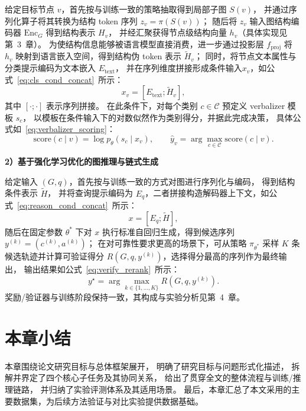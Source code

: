 给定目标节点 $v$，首先按与训练一致的策略抽取得到局部子图 $S(v)$，
并通过序列化算子将其转换为结构 token 序列 $z_v=\pi(S(v))$；
随后将 $z_v$ 输入图结构编码器 $\mathrm{Enc}_G$ 得到结构表示 $H_v$，
并经汇聚获得节点级结构向量 $h_v$（具体实现见第~3~章）。
为使结构信息能够被语言模型直接消费，进一步通过投影层 $f_{\mathrm{proj}}$
将 $h_v$ 映射到语言嵌入空间，得到结构伪 token 表示 $\tilde{H}_v$；
同时，将节点文本属性与分类提示编码为文本嵌入 $E_{\mathrm{text}}$，
并在序列维度拼接形成条件输入\(x_v\)，如公式~\ref{eq:cls_cond_concat}\ 所示：
\begin{equation}
x_v=[E_{\mathrm{text}};\tilde{H}_v],
\label{eq:cls_cond_concat}
\end{equation}
其中 $[\cdot;\cdot]$ 表示序列拼接。
在此条件下，对每个类别 $c\in\mathcal{C}$ 预定义 verbalizer 模板 $s_c$，
以模板在条件输入下的对数似然作为类别得分，并据此完成决策，
具体公式如~\ref{eq:verbalizer_scoring}：
\begin{equation}
\mathrm{score}(c\mid v)=\log p_{\theta}(s_c\mid x_v),\qquad
\hat{y}_v=\arg\max_{c\in\mathcal{C}}\mathrm{score}(c\mid v).
\label{eq:verbalizer_scoring}
\end{equation}

\textbf{2）基于强化学习优化的图推理与链式生成}

给定输入 $(G,q)$，首先按与训练一致的方式对图进行序列化与编码，
得到结构条件表示 $\tilde{H}$，
并将查询提示编码为 $E_q$，二者拼接构造解码器上下文，如公式~\ref{eq:reason_cond_concat}\ 所示：
\begin{equation}
x=[E_q;\tilde{H}],
\label{eq:reason_cond_concat}
\end{equation}
随后在固定参数 $\theta^\ast$ 下对 $x$ 执行标准自回归生成，得到候选序列
$y^{(k)}=(c^{(k)},a^{(k)})$；
在对可靠性要求更高的场景下，可从策略 $\pi_{\theta^\ast}$ 
采样 $K$ 条候选轨迹并计算可验证得分
$R(G,q,y^{(k)})$，选择得分最高的序列作为最终输出，
输出结果如公式~\ref{eq:verify_rerank}\ 所示：
\begin{equation}
y^\star=\arg\max_{k\in\{1,\ldots,K\}} R(G,q,y^{(k)}).
\label{eq:verify_rerank}
\end{equation}
奖励/验证器与训练阶段保持一致，其构成与实验分析见第~4~章。


\section{本章小结}
本章围绕论文研究目标与总体框架展开，
明确了研究目标与问题形式化描述，
拆解并界定了四个核心子任务及其协同关系，
给出了贯穿全文的整体流程与训练/推理链路，
并归纳了实验评测体系及其适用场景。
最后，本章汇总了本文采用的主要数据集，为后续方法验证与对比实验提供数据基础。

